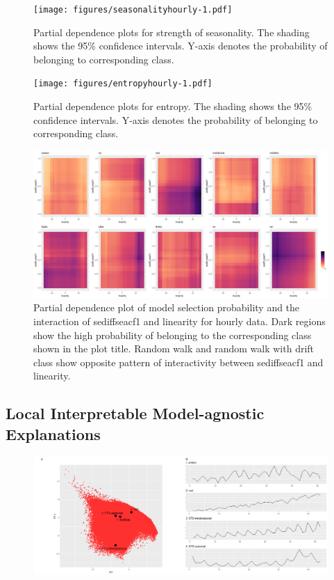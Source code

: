 \documentclass[11pt,a4paper,]{article}
\begin{document}
\begin{figure}
\centering
\texttt{[image: figures/seasonalityhourly-1.pdf]}
\caption{\label{fig:seasonalityhourly}Partial dependence plots for strength of seasonality. The shading shows the 95\% confidence intervals. Y-axis denotes the probability of belonging to corresponding class.}
\end{figure}

\begin{figure}
\centering
\texttt{[image: figures/entropyhourly-1.pdf]}
\caption{\label{fig:entropyhourly}Partial dependence plots for entropy. The shading shows the 95\% confidence intervals. Y-axis denotes the probability of belonging to corresponding class.}
\end{figure}

\begin{figure}
\centering
\includegraphics{figures/htwopdp-1.png}
\caption{\label{fig:htwopdp}Partial dependence plot of model selection probability and the interaction of sediffseacf1 and linearity for hourly data. Dark regions show the high probability of belonging to the corresponding class shown in the plot title. Random walk and random walk with drift class show opposite pattern of interactivity between sediffseacf1 and linearity.}
\end{figure}

\clearpage

\hypertarget{local-interpretable-model-agnostic-explanations}{%
\subsection{Local Interpretable Model-agnostic Explanations}\label{local-interpretable-model-agnostic-explanations}}

\begin{figure}[h]

{\centering \includegraphics{figures/quarterlylime-1} 

}

\end{figure}
\end{document}
